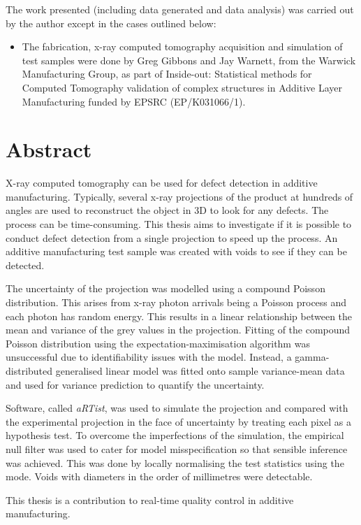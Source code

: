\documentclass[12pt, a4paper, twoside]{memoir}
\begin{document}
The work presented (including data generated and data analysis) was carried out by the author except in the cases outlined below:
\begin{itemize}
  \item The fabrication, x-ray computed tomography acquisition and simulation of test samples were done by Greg Gibbons and Jay Warnett, from the Warwick Manufacturing Group, as part of Inside-out: Statistical methods for Computed Tomography validation of complex structures in Additive Layer Manufacturing funded by EPSRC (EP/K031066/1).
\end{itemize}

\chapter{Abstract}
X-ray computed tomography can be used for defect detection in additive manufacturing. Typically, several x-ray projections of the product at hundreds of angles are used to reconstruct the object in 3D to look for any defects. The process can be time-consuming. This thesis aims to investigate if it is possible to conduct defect detection from a single projection to speed up the process. An additive manufacturing test sample was created with voids to see if they can be detected.

The uncertainty of the projection was modelled using a compound Poisson distribution. This arises from x-ray photon arrivals being a Poisson process and each photon has random energy. This results in a linear relationship between the mean and variance of the grey values in the projection. Fitting of the compound Poisson distribution using the expectation-maximisation algorithm was unsuccessful due to identifiability issues with the model. Instead, a gamma-distributed generalised linear model was fitted onto sample variance-mean data and used for variance prediction to quantify the uncertainty.

Software, called \emph{aRTist}, was used to simulate the projection and compared with the experimental projection in the face of uncertainty by treating each pixel as a hypothesis test. To overcome the imperfections of the simulation, the empirical null filter was used to cater for model misspecification so that sensible inference was achieved. This was done by locally normalising the test statistics using the mode. Voids with diameters in the order of millimetres were detectable.

This thesis is a contribution to real-time quality control in additive manufacturing.
\end{document}
